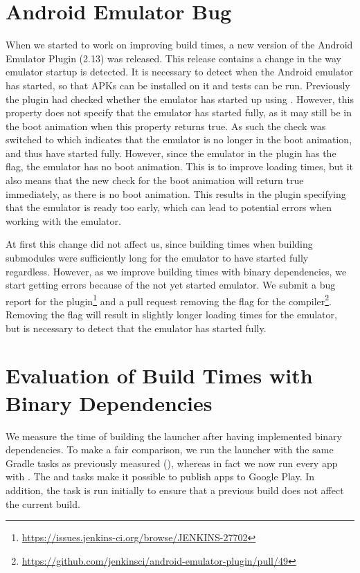 \section{Android Emulator Bug}\label{sec:emulator_bug}
When we started to work on improving build times, a new version of the Android Emulator Plugin (2.13) was released. This release contains a change in the way emulator startup is detected. It is necessary to detect when the Android emulator has started, so that APKs can be installed on it and tests can be run. Previously the plugin had checked whether the emulator has started up using . However, this property does not specify that the emulator has started fully, as it may still be in the boot animation when this property returns true. As such the check was switched to   which indicates that the emulator is no longer in the boot animation, and thus have started fully. However, since the emulator in the plugin has the  flag, the emulator has no boot animation. This is to improve loading times, but it also means that the new check for the boot animation will return true immediately, as there is no boot animation. This results in the plugin specifying that the emulator is ready too early, which can lead to potential errors when working with the emulator.

At first this change did not affect us, since building times when building submodules were sufficiently long for the emulator to have started fully regardless. However, as we improve building times with binary dependencies, we start getting errors because of the not yet started emulator. We submit a bug report for the plugin\footnote{\url{https://issues.jenkins-ci.org/browse/JENKINS-27702}} and a pull request removing the  flag for the compiler\footnote{\url{https://github.com/jenkinsci/android-emulator-plugin/pull/49}}. Removing the  flag will result in slightly longer loading times for the emulator, but is necessary to detect that the emulator has started fully.

\section{Evaluation of Build Times with Binary Dependencies}\label{sec:faster_build_evaluation}
We measure the time of building the launcher after having implemented binary dependencies. To make a fair comparison, we run the launcher with the same Gradle tasks as previously measured (), whereas in fact we now run every app with . The  and  tasks make it possible to publish apps to Google Play. In addition, the  task is run initially to ensure that a previous build does not affect the current build.

